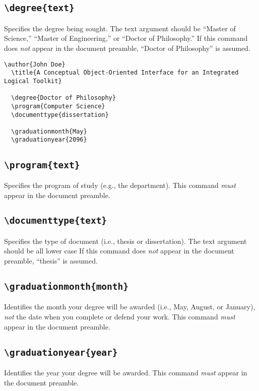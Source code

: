\documentclass[10pt]{article}
\newcommand{\command}[1]{\texttt{\textbackslash#1}}
\begin{document}
\subsection{\command{degree\{text\}}}
Specifies the degree being sought.
The text argument should be ``Master of Science,'' ``Master of Engineering,'' or ``Doctor of Philosophy.''
If this command does \emph{not} appear in the document preamble, ``Doctor of Philosophy'' is assumed.

\begin{lstlisting}[gobble=2,float=t,caption={Sample document preamble showing the \command{degree}, \command{program}, \command{documenttype}, \command{graduationmonth}, and \command{graduationyear} commands.}]
  \author{John Doe}
  \title{A Conceptual Object-Oriented Interface for an Integrated Logical Toolkit}
  
  \degree{Doctor of Philosophy}
  \program{Computer Science}
  \documenttype{dissertation}
  
  \graduationmonth{May}
  \graduationyear{2096}
\end{lstlisting}

\subsection{\command{program\{text\}}}
Specifies the program of study (e.g., the department).
This command \emph{must} appear in the document preamble.

\subsection{\command{documenttype\{text\}}}
Specifies the type of document (i.e., thesis or dissertation).
The text argument should be all lower case
If this command does \emph{not} appear in the document preamble, ``thesis'' is assumed.

\subsection{\command{graduationmonth\{month\}}}
Identifies the month your degree will be awarded (i.e., May, August, or January), \emph{not} the date when you complete or defend your work.
This command \emph{must} appear in the document preamble.

\subsection{\command{graduationyear\{year\}}}
Identifies the year your degree will be awarded.
This command \emph{must} appear in the document preamble.
\end{document}
